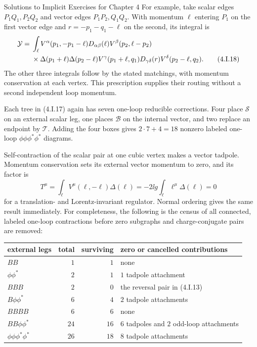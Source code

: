 \begin{bankssolutions}{Solutions to Implicit Exercises for Chapter 4}
For example, take scalar edges $P_1Q_1,P_2Q_2$ and vector edges
$P_1P_2,Q_1Q_2$.  With momentum $\ell$ entering $P_1$ on the first vector
edge and $r=-p_1-q_1-\ell$ on the second, its integral is
\begin{align*}
 \mathcal Y={}&\int_\ell
 V^\alpha(p_1,-p_1-\ell)D_{\alpha\beta}(\ell)
 V^\beta(p_2,\ell-p_2)\notag\\
 &\times\Delta(p_1+\ell)\Delta(p_2-\ell)
 V^\gamma(p_1+\ell,q_1)D_{\gamma\delta}(r)
 V^\delta(p_2-\ell,q_2).
 \tag{4.I.18}
\end{align*}
The other three integrals follow by the stated matchings, with momentum
conservation at each vertex.  This prescription supplies their routing
without a second independent loop momentum.

Each tree in (4.I.17) again has seven one-loop reducible corrections.  Four
place $\mathcal S$ on an external scalar leg, one places $\mathcal B$ on the
internal vector, and two replace an endpoint by $\mathcal T$.  Adding the
four boxes gives $2\cdot7+4=18$ nonzero labeled one-loop
$\phi\phi\phi^*\phi^*$ diagrams.

Self-contraction of the scalar pair at one cubic vertex makes a vector
tadpole.  Momentum conservation sets its external vector momentum to zero,
and its factor is
\begin{equation*}
 T^\mu=\int_\ell V^\mu(\ell,-\ell)\Delta(\ell)
 =-2\ii g\int_\ell\ell^\mu\Delta(\ell)=0
 \tag{4.I.19}
\end{equation*}
for a translation- and Lorentz-invariant regulator.  Normal ordering gives
the same result immediately.  For completeness, the following is the census
of all connected, labeled one-loop contractions before zero subgraphs and
charge-conjugate pairs are removed:

\begin{center}
\small
\begin{tabular}{@{}lrrl@{}}
external legs & total & surviving & zero or cancelled contributions \\ \hline
$BB$ & $1$ & $1$ & none \\
$\phi\phi^*$ & $2$ & $1$ & $1$ tadpole attachment \\
$BBB$ & $2$ & $0$ & the reversal pair in (4.I.13) \\
$B\phi\phi^*$ & $6$ & $4$ & $2$ tadpole attachments \\
$BBBB$ & $6$ & $6$ & none \\
$BB\phi\phi^*$ & $24$ & $16$ & $6$ tadpoles and $2$ odd-loop attachments \\
$\phi\phi\phi^*\phi^*$ & $26$ & $18$ & $8$ tadpole attachments
\end{tabular}
\end{center}


\end{bankssolutions}
